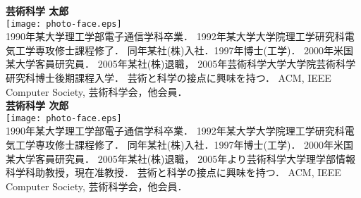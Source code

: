 
\noindent
\textbf{芸術科学 太郎}
\vspace{1mm} \\
\texttt{[image: photo-face.eps]} \\
1990年某大学理工学部電子通信学科卒業．
1992年某大学大学院理工学研究科電気工学専攻修士課程修了．
同年某社(株)入社．1997年博士(工学)．
2000年米国某大学客員研究員．
2005年某社(株)退職，
2005年芸術科学大学大学院芸術科学研究科博士後期課程入学．
芸術と科学の接点に興味を持つ．
ACM, IEEE Computer Society, 芸術科学会，他会員．
%
\vspace{3mm}
\\
%
\textbf{芸術科学 次郎}
\vspace{1mm} \\
\texttt{[image: photo-face.eps]} \\
1990年某大学理工学部電子通信学科卒業．
1992年某大学大学院理工学研究科電気工学専攻修士課程修了．
同年某社(株)入社．1997年博士(工学)．
2000年米国某大学客員研究員．
2005年某社(株)退職，
2005年より芸術科学大学理学部情報科学科助教授，現在准教授．
芸術と科学の接点に興味を持つ．
ACM, IEEE Computer Society, 芸術科学会，他会員．

